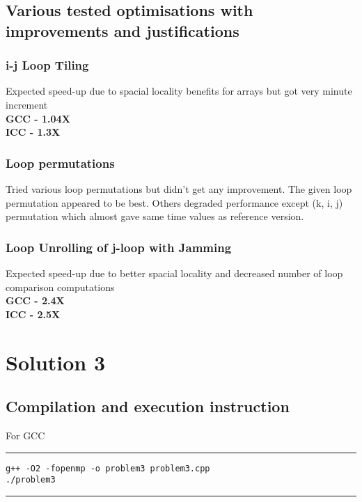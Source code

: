 \documentclass[a4paper]{article}
\begin{document}
\newpage

\subsection{Various tested optimisations with improvements and justifications}

\subsubsection{\large\bf i-j Loop Tiling}
Expected speed-up due to spacial locality benefits for arrays but got very minute increment \\
{\bf GCC - 1.04X} \\
{\bf ICC - 1.3X} 

\subsubsection{\large\bf Loop permutations}
Tried various loop permutations but didn't get any improvement. The given loop permutation appeared to be best. Others degraded performance except (k, i, j) permutation which almost gave same time values as reference version.

\subsubsection{\large\bf Loop Unrolling of j-loop with Jamming}
Expected speed-up due to better spacial locality and decreased number of loop comparison computations \\
{\bf GCC - 2.4X} \\
{\bf ICC - 2.5X} 




\section{\Huge Solution 3}
\vspace{0.2cm}
\subsection{Compilation and execution instruction }
\vspace{0.3cm}
For GCC
\vspace{0.2cm}
\hrule
\begin{lstlisting}
g++ -O2 -fopenmp -o problem3 problem3.cpp
./problem3
\end{lstlisting}
\hrule 
\vspace{0.3cm}
\end{document}
